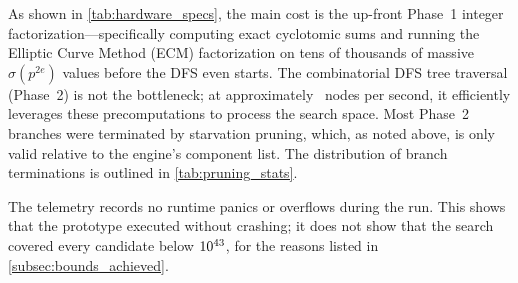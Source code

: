 \begin{table}[htbp]
    \centering
    \caption{Hardware specifications and search telemetry.}
    \label{tab:hardware_specs}
\end{table}

As shown in \cref{tab:hardware_specs}, the main cost
is the up-front Phase~1 integer factorization---specifically computing exact
cyclotomic sums and running the Elliptic Curve Method (ECM) factorization on
tens of thousands of massive $\sigma(p^{2e})$ values before the DFS even starts.
The combinatorial DFS tree traversal (Phase~2) is not the bottleneck; at approximately
\TelemetryNodesPerSec\ nodes per second, it efficiently leverages these precomputations
to process the search space.  Most Phase~2 branches were terminated
by starvation pruning, which, as noted above, is only valid relative to
the engine's component list.  The distribution of branch
terminations is outlined in \cref{tab:pruning_stats}.

\begin{table}[htbp]
  \centering
  \caption{Distribution of topological branch pruning strategies across
           DFS execution (Total branches pruned: \TelemetryPruned).}
  \label{tab:pruning_stats}
\end{table}

The telemetry records no runtime panics or overflows during the run.
This shows that the prototype executed without crashing; it does not
show that the search covered every candidate below
$10^{43}$, for the reasons listed in
\cref{subsec:bounds_achieved}.
